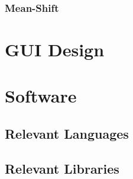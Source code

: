 \subsubsection{Mean-Shift}\label{literature_review_mean_shift}


\section{GUI Design}

\section{Software}

\subsection{Relevant Languages}

\subsection{Relevant Libraries}




